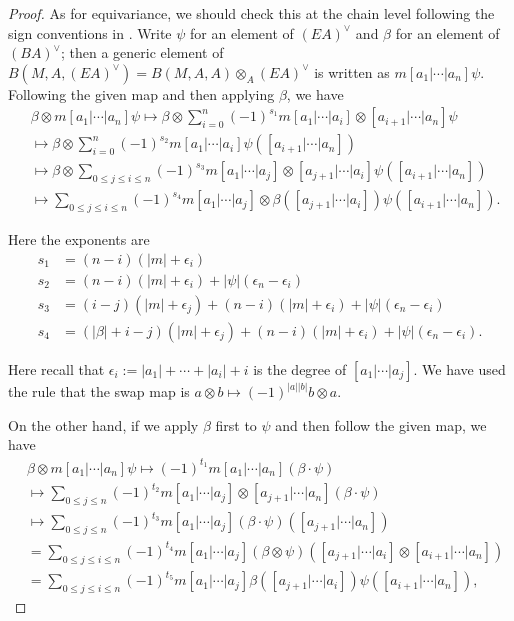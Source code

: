 \documentclass{memo-l}
\theoremstyle{definition}
\theoremstyle{remark}
\numberwithin{section}{chapter}
\numberwithin{equation}{chapter}
\begin{document}
\begin{proof}
As for equivariance, we should check this at the chain level following the sign conventions in \cite{TLSigns}. Write $\psi$ for an element of $(EA)^\vee$ and $\beta$ for an element of $(BA)^\vee$; then a generic element of $B(M, A, (EA)^\vee) = B(M, A, A) \otimes_A (EA)^\vee$ is written as $m[a_1 | \cdots | a_n ] \psi$. Following the given map and then applying $\beta$, we have
\begin{align*}&\beta \otimes m[a_1 | \cdots | a_n] \psi \mapsto \beta \otimes \sum_{i=0}^n (-1)^{s_1} m[a_1 | \cdots | a_i] \otimes [a_{i+1} | \cdots | a_n]\psi \\
&\mapsto \beta \otimes \sum_{i=0}^n (-1)^{s_2} m[a_1 | \cdots | a_i] \psi([a_{i+1} | \cdots | a_n]) \\
&\mapsto \beta \otimes \sum_{0 \leq j \leq i \leq n} (-1)^{s_3} m[a_1 | \cdots | a_j] \otimes [a_{j+1} | \cdots | a_i] \psi([a_{i+1} | \cdots | a_n])\\
&\mapsto \sum_{0 \leq j \leq i \leq n} (-1)^{s_4} m[a_1 | \cdots | a_j] \otimes \beta([a_{j+1} | \cdots | a_i]) \psi([a_{i+1} | \cdots | a_n]).
\end{align*}

Here the exponents are
\begin{align*}
s_1 &= (n-i)(|m|+\epsilon_i)\\
s_2 &= (n-i)(|m|+\epsilon_i) + |\psi|(\epsilon_n - \epsilon_i)\\
s_3 &= (i-j)(|m|+\epsilon_j)+(n-i)(|m|+\epsilon_i) + |\psi|(\epsilon_n - \epsilon_i)\\
s_4 &= (|\beta|+i-j)(|m|+\epsilon_j)+(n-i)(|m|+\epsilon_i) + |\psi|(\epsilon_n - \epsilon_i).
\end{align*}

Here recall that $\epsilon_i := |a_1| + \cdots + |a_i| + i$ is the degree of $[a_1| \cdots | a_j]$. We have used the rule that the swap map is $a \otimes b \mapsto (-1)^{|a||b|} b \otimes a$.

On the other hand, if we apply $\beta$ first to $\psi$ and then follow the given map, we have
\begin{align*}&\beta \otimes m[a_1 | \cdots | a_n] \psi \mapsto (-1)^{t_1} m[a_1| \cdots | a_n] (\beta \cdot \psi) \\
&\mapsto \sum_{0 \leq j \leq n} (-1)^{t_2} m[a_1 |\cdots |a_j] \otimes [a_{j+1} | \cdots | a_n] (\beta \cdot \psi) \\
&\mapsto \sum_{0 \leq j \leq n} (-1)^{t_3}m[a_1|\cdots |a_j] (\beta \cdot \psi)([a_{j+1} | \cdots | a_n])\\
&= \sum_{0 \leq j \leq i \leq n} (-1)^{t_4}m[a_1 |\cdots |a_j](\beta \otimes \psi)([a_{j+1} | \cdots | a_i] \otimes [a_{i+1} | \cdots | a_n])\\
&= \sum_{0 \leq j \leq i \leq n} (-1)^{t_5} m[a_1 | \cdots | a_j] \beta([a_{j+1}| \cdots | a_i]) \psi([a_{i+1}| \cdots | a_n]),
\end{align*}


\end{proof}
\end{document}
